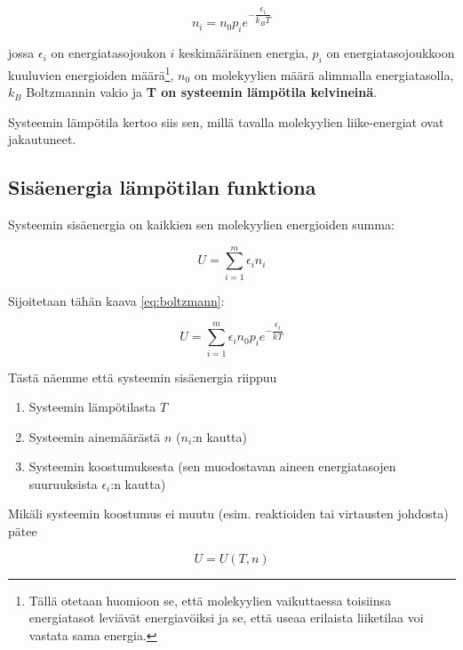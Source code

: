 \documentclass[12pt,a4paper,finnish]{book}
\begin{document}
\begin{equation}
\label{eq:boltzmann}
 n_i = n_0p_ie^{-\dfrac{\epsilon_i}{k_BT}}
\end{equation}

jossa $\epsilon_i$ on energiatasojoukon $i$ keskimääräinen energia, $p_i$ on energiatasojoukkoon kuuluvien energioiden 
määrä\footnote{Tällä otetaan huomioon se, että molekyylien vaikuttaessa toisiinsa energiatasot leviävät energiavöiksi ja 
se, että useaa erilaista liiketilaa voi vastata sama energia.}, $n_0$ on molekyylien määrä alimmalla 
energiatasolla, $k_B$ Boltzmannin vakio ja \textbf{T on systeemin lämpötila kelvineinä}.


Systeemin lämpötila kertoo siis sen, millä tavalla molekyylien liike-energiat ovat jakautuneet.

\subsection{Sisäenergia lämpötilan funktiona} %

Systeemin sisäenergia on kaikkien sen molekyylien energioiden summa:

\begin{equation}
 U = \sum_{i=1}^m\epsilon_in_i
\end{equation}

Sijoitetaan tähän kaava \ref{eq:boltzmann}:

\begin{equation}
 U = \sum_{i=1}^m\epsilon_in_0p_ie^{-\dfrac{\epsilon_i}{kT}}
\end{equation}

Tästä näemme että systeemin sisäenergia riippuu

\begin{enumerate}
 \item Systeemin lämpötilasta $T$
 \item Systeemin ainemäärästä $n$ ($n_i$:n kautta)
 \item Systeemin koostumuksesta (sen muodostavan aineen energiatasojen suuruuksista $\epsilon_i$:n kautta)
\end{enumerate}

Mikäli systeemin koostumus ei muutu (esim. reaktioiden tai virtausten johdosta) pätee

\begin{equation}
 U = U(T, n)
\end{equation}
\end{document}
